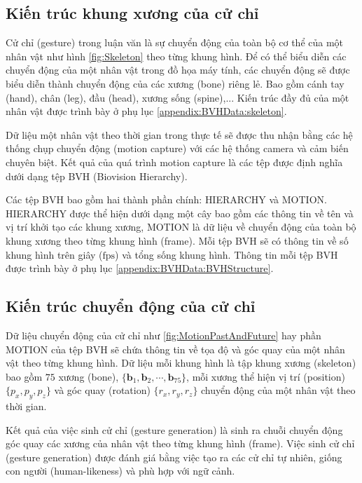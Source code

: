 \subsection{Kiến trúc khung xương của cử chỉ}

Cử chỉ (gesture) trong luận văn là sự chuyển động của toàn bộ cơ thể của một nhân vật như hình \autoref{fig:Skeleton} theo từng khung hình. Để có thể biểu diễn các chuyển động của một nhân vật trong đồ họa máy tính, các chuyển động sẽ được biểu diễn thành chuyển động của các xương (bone) riêng lẻ. Bao gồm cánh tay (hand), chân (leg), đầu (head), xương sống (spine),... Kiến trúc đầy đủ của một nhân vật được trình bày ở phụ lục \autoref{appendix:BVHData:skeleton}.

Dữ liệu một nhân vật theo thời gian trong thực tế sẽ được thu nhận bằng các hệ thống chụp chuyển động (motion capture) với các hệ thống camera và cảm biến chuyên biệt. Kết quả của quá trình motion capture là các tệp được định nghĩa dưới dạng tệp BVH (Biovision Hierarchy).

Các tệp BVH bao gồm hai thành phần chính: {HIERARCHY} và {MOTION}. HIERARCHY được thể hiện dưới dạng một cây bao gồm các thông tin về tên và vị trí khởi tạo các khung xương, MOTION là dữ liệu về chuyển động của toàn bộ khung xương theo từng khung hình (frame).  Mỗi tệp BVH sẽ có thông tin về số khung hình trên giây ($\text{fps}$) và tổng sống khung hình. Thông tin mỗi tệp BVH được trình bày ở phụ lục \autoref{appendix:BVHData:BVHStructure}. 


\subsection{Kiến trúc chuyển động của cử chỉ}

Dữ liệu chuyển động của cử chỉ như \autoref{fig:MotionPastAndFuture} hay phần MOTION của tệp BVH sẽ chứa thông tin về tọa độ và góc quay của một nhân vật theo từng khung hình. Dữ liệu mỗi khung hình là tập khung xương (skeleton) bao gồm $75$ xương (bone), $\{ \textbf{b}_{1}, \textbf{b}_{2}, \cdots , \textbf{b}_{75} \}$, mỗi xương thể hiện vị trí (position) $\{ p_{x}, p_{y}, p_{z} \}$ và góc quay (rotation) $\{ r_{x}, r_{y}, r_{z} \}$ chuyển động của một nhân vật theo thời gian.

Kết quả của việc sinh cử chỉ (gesture generation) là sinh ra chuỗi chuyển động góc quay các xương của nhân vật theo từng khung hình (frame). Việc sinh cử chỉ (gesture generation) được đánh giá bằng việc tạo ra các cử chỉ tự nhiên, giống con người (human-likeness) và phù hợp với ngữ cảnh.

